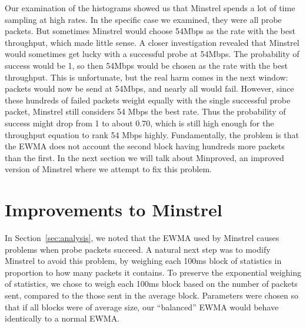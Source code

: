 \documentclass[twocolumn,10pt]{article}
\begin{document}
Our examination of the histograms showed us that Minstrel spends a lot
of time sampling at high rates.  In the specific case we examined, they
were all probe packets.  But sometimes Minstrel would choose 54Mbps as
the rate with the best throughput, which made little sense.  A closer
investigation revealed that Minstrel would sometimes get lucky with a
successful probe at 54Mbps.  The probability of success would be 1, so
then 54Mbps would be chosen as the rate with the best throughput.  This
is unfortunate, but the real harm comes in the next window: packets
would now be send at 54Mbps, and nearly all would fail.  However,
since these hundreds of failed packets weight equally with the single
successful probe packet, Minstrel still considers 54 Mbps the best
rate.  Thus the probability of success might drop from 1 to about 0.70,
which is still high enough for the throughput equation to rank 54 Mbps
highly.  Fundamentally, the problem is that the EWMA does not account
the second block having hundreds more packets than the first.  In the
next section we will talk about Minproved, an improved version of
Minstrel where we attempt to fix this problem.


\section{Improvements to Minstrel}

In Section~\ref{sec:analysis}, we noted that the EWMA used by Minstrel
causes problems when probe packets succeed.  A natural next step was
to modify Minstrel to avoid this problem, by weighing each 100ms block
of statistics in proportion to how many packets it contains.  To
preserve the exponential weighing of statistics, we chose to weigh
each 100ms block based on the number of packets sent, compared to the
those sent in the average block.  Parameters were chosen so that if
all blocks were of average size, our ``balanced'' EWMA would behave
identically to a normal EWMA.
\end{document}
